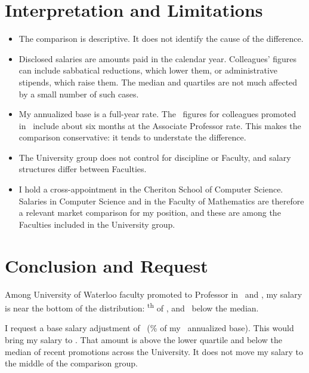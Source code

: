 \documentclass{article}
\newif\ifUnitComparisons
\begin{document}
\section*{Interpretation and Limitations}

\begin{itemize}[leftmargin=*,itemsep=0.2em]
    \item The comparison is descriptive. It does not identify the cause of the difference.
    \item Disclosed salaries are amounts paid in the calendar year. Colleagues' figures can include sabbatical reductions, which lower them, or administrative stipends, which raise them. The median and quartiles are not much affected by a small number of such cases.
    \item My annualized base is a full-year rate. The \PoolYear\ figures for colleagues promoted in \PoolYear\ include about six months at the Associate Professor rate. This makes the comparison conservative: it tends to understate the difference.
    \item The University group does not control for discipline or Faculty, and salary structures differ between Faculties.\ifUnitComparisons\ Within the Faculty of Health, my salary is also the lowest of the recent promotions. That subset is small, and it counts only faculty on current unit listings, so a person who left after promotion is not included.\fi
    \item I hold a cross-appointment in the Cheriton School of Computer Science. Salaries in Computer Science and in the Faculty of Mathematics are therefore a relevant market comparison for my position, and these are among the Faculties included in the University group.
\end{itemize}

\section*{Conclusion and Request}

Among University of Waterloo faculty promoted to Professor in \PoolPrevYear\ and \PoolYear, my salary is near the bottom of the distribution: \SubjectRank\textsuperscript{th} of \PoolN, and \GapMedian\ below the median. \ifUnitComparisons Within the Faculty of Health, my salary is the lowest of the \HealthN\ recent promotions, and within SPHS it is the lowest of the \the\numexpr\SphsNProf+1\relax\ Professors and below \SphsNAssocAbove\ of the \SphsNAssoc\ Associate Professors.\fi

I request a base salary adjustment of \RequestAdj\ (\RequestPct\% of my \PoolYear\ annualized base). This would bring my salary to \RequestTarget. That amount is above the lower quartile and below the median of recent promotions across the University. It does not move my salary to the middle of the comparison group.
\end{document}
